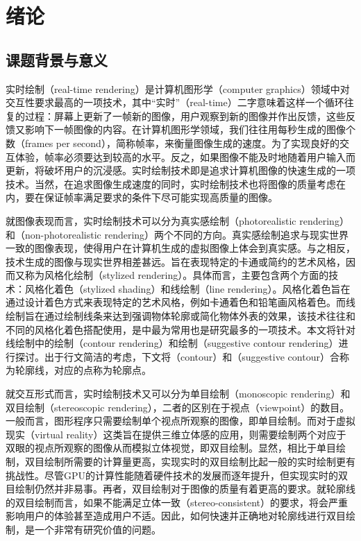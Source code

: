 \chapter{绪论}

\section{课题背景与意义}

实时绘制（real-time rendering）是计算机图形学（computer graphics）领域中对交互性要求最高的一项技术，其中“实时”（real-time）二字意味着这样一个循环往复的过程：屏幕上更新了一帧新的图像，用户观察到新的图像并作出反馈，这些反馈又影响下一帧图像的内容。在计算机图形学领域，我们往往用每秒生成的图像个数（frames per second），简称帧率，来衡量图像生成的速度。为了实现良好的交互体验，帧率必须要达到较高的水平。反之，如果图像不能及时地随着用户输入而更新，将破坏用户的沉浸感。实时绘制技术即是追求计算机图像的快速生成的一项技术。当然，在追求图像生成速度的同时，实时绘制技术也将图像的质量考虑在内，要在保证帧率满足要求的条件下尽可能实现高质量的图像。

就图像表现而言，实时绘制技术可以分为真实感绘制（photorealistic rendering）和\npr{}（non-photorealistic rendering）两个不同的方向。真实感绘制追求与现实世界一致的图像表现，使得用户在计算机生成的虚拟图像上体会到真实感。与之相反，\npr{}技术生成的图像与现实世界相差甚远。\npr{}旨在表现特定的卡通或简约的艺术风格，因而又称为风格化绘制（stylized rendering）。具体而言，\npr{}主要包含两个方面的技术：风格化着色（stylized shading）和线绘制（line rendering）。风格化着色旨在通过设计着色方式来表现特定的艺术风格，例如卡通着色和铅笔画风格着色。而线绘制旨在通过绘制线条来达到强调物体轮廓或简化物体外表的效果，该技术往往和不同的风格化着色搭配使用，是\npr{}中最为常用也是研究最多的一项技术。本文将针对线绘制中的\con{}绘制（contour rendering）和\scon{}绘制（suggestive contour rendering）进行探讨。出于行文简洁的考虑，下文将\con{}（contour）和\scon{}（suggestive contour）合称为轮廓线，对应的点称为轮廓点。

就交互形式而言，实时绘制技术又可以分为单目绘制（monoscopic rendering）和双目绘制（stereoscopic rendering），二者的区别在于视点（viewpoint）的数目。一般而言，图形程序只需要绘制单个视点所观察的图像，即单目绘制。而对于虚拟现实（virtual reality）这类旨在提供三维立体感的应用，则需要绘制两个对应于双眼的视点所观察的图像从而模拟立体视觉，即双目绘制。显然，相比于单目绘制，双目绘制所需要的计算量更高，实现实时的双目绘制比起一般的实时绘制更有挑战性。尽管GPU的计算性能随着硬件技术的发展而逐年提升，但实现实时的双目绘制仍然并非易事。再者，双目绘制对于图像的质量有着更高的要求。就轮廓线的双目绘制而言，如果不能满足立体一致（stereo-consistent）的要求，将会严重影响用户的体验甚至造成用户不适。因此，如何快速并正确地对轮廓线进行双目绘制，是一个非常有研究价值的问题。

